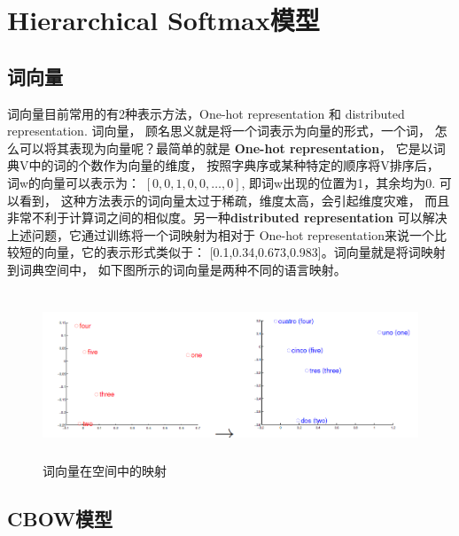     \chapter{Hierarchical Softmax模型}
    \section{词向量}
    词向量目前常用的有2种表示方法，One-hot representation 
    和 distributed representation. 词向量，
    顾名思义就是将一个词表示为向量的形式，一个词，
    怎么可以将其表现为向量呢？最简单的就是
    \textbf{One-hot representation}，
    它是以词典V中的词的个数作为向量的维度，
    按照字典序或某种特定的顺序将V排序后，
    词w的向量可以表示为： $[0, 0, 1, 0, 0 , \dots, 0]$,
    即词w出现的位置为1，其余均为0. 可以看到，
    这种方法表示的词向量太过于稀疏，维度太高，会引起维度灾难，
    而且非常不利于计算词之间的相似度。另一种\textbf{distributed representation}
    可以解决上述问题，它通过训练将一个词映射为相对于
    One-hot representation来说一个比较短的向量，它的表示形式类似于：
    [0.1,0.34,0.673,0.983]。词向量就是将词映射到词典空间中，
    如下图所示的词向量是两种不同的语言映射。

    \begin{figure}[h]
        \begin{center}
            \includegraphics[width=13cm,height=5cm]{2_1}
            \caption{词向量在空间中的映射}
        \end{center}
    \end{figure}

    \section{CBOW模型}
